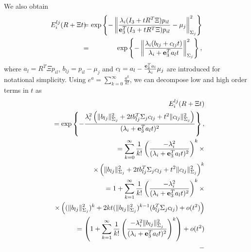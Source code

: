 \documentclass[conference,letterpaper]{ieeeconf}
\begin{document}
We also obtain
\begin{eqnarray}
E^{lj}_i(R + \Xi t) \!\!&\!\!=\!\!&\!\! 
\exp\left\{-
\left\|
\frac{\lambda_i 
(I_3 + tR^T\Xi)p_{il}}{{\bf e}_3^T (I_3 + tR^T\Xi )p_{il}}
- \mu_j \right\|^2_{\Sigma_j}\right\}
\nonumber\\
\!\!&\!\!=\!\!&\!\!  \exp\left\{-\left\|
 \frac{\lambda_i(b_{lj} + c_{lj}t)}{ \lambda_i +  {\bf e}_3^Ta_{l}t}
\right\|^2_{\Sigma_j}\right\},
\label{eqn:app3}
\end{eqnarray}
where $a_l =  R^T\Xi p_{il}$, 
$b_{lj} = p_{il} - \mu_j$ and $c_l = a_l - \frac{ {\bf e}_3^Ta_{l} }{\lambda_i}\mu_j$
are introduced for notational simplicity.
Using $e^a = \sum_{k=0}^{\infty}\frac{a^k}{k!}$,
we can decompose low and high order terms in $t$
as
\begin{eqnarray}
\hspace{-.8cm}&&E^{lj}_i(R + \Xi t) 
\nonumber\\
\hspace{-.8cm}&&= \exp\left\{-
\frac{\lambda_i^2\left(
\|b_{lj}\|^2_{\Sigma_j} + 2 tb_{lj}^T \Sigma_j c_{lj}
+ t^2 \|c_{lj}\|^2_{\Sigma_j}
\right)}{ (\lambda_i + {\bf e}_3^Ta_{l}t)^2}
\right\},
\nonumber\\
\hspace{-.8cm}&&= \sum_{k = 0}^{\infty}
\frac{1}{k!}
\left(
\frac{-\lambda_i^2}{ (\lambda_i + {\bf e}_3^Ta_{l}t)^2}
\right)^k\times
\nonumber\\
\hspace{-.8cm}&&\hspace{1.5cm}
\times
\left(
\|b_{lj}\|^2_{\Sigma_j} + 2 tb_{lj}^T \Sigma_j c_{lj}
+ t^2 \|c_{lj}\|^2_{\Sigma_j}
\right)^k
\nonumber\\
\hspace{-.8cm}&&=
1 + 
\sum_{k = 1}^{\infty}
\frac{1}{k!}
\left(
\frac{-\lambda_i^2}{ (\lambda_i + {\bf e}_3^Ta_{l}t)^2}
\right)^k\times
\nonumber\\
\hspace{-.8cm}&&\hspace{0.8cm}
\times
\left(
(\|b_{lj}\|^2_{\Sigma_j})^k + 2k t (\|b_{lj}\|^2_{\Sigma_j})^{k-1}(b_{lj}^T \Sigma_j c_{lj})
+ o(t^2)
\right)
\nonumber\\
\hspace{-.8cm}&&= \left(1 + 
\sum_{k = 1}^{\infty}
\frac{1}{k!}
\left(
\frac{-\lambda_i^2\|b_{lj}\|^2_{\Sigma_j}}{ (\lambda_i + {\bf e}_3^Ta_{l}t)^2}
\right)^k\right)+ o(t^2)
\nonumber\\
\hspace{-.8cm}&&\hspace{.4cm}-

\end{eqnarray}
\end{document}
